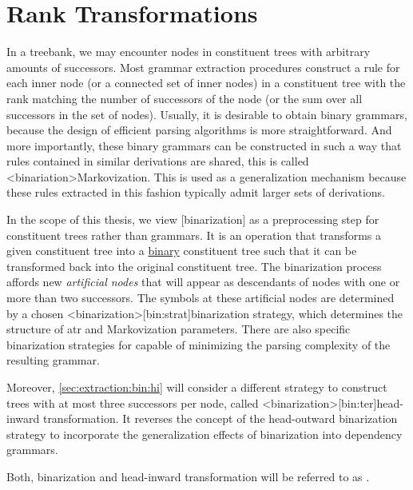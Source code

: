 \documentclass[../../document.tex]{subfiles}
\begin{document}
    \section{Rank Transformations}
    In a treebank, we may encounter nodes in constituent trees with arbitrary amounts of successors.
    Most grammar extraction procedures construct a rule for each inner node (or a connected set of inner nodes) in a constituent tree with the rank matching the number of successors of the node (or the sum over all successors in the set of nodes).
    Usually, it is desirable to obtain binary grammars, because the design of efficient parsing algorithms is more straightforward.
    And more importantly, these binary grammars can be constructed in such a way that rules contained in similar derivations are shared, this is called <binariation>{Markovization}.
    This is used as a generalization mechanism because these rules extracted in this fashion typically admit larger sets of derivations.

    In the scope of this thesis, we view [binarization] as a preprocessing step for constituent trees rather than grammars.
    It is an operation that transforms a given constituent tree into a \hyperlink{binctree}{binary} constituent tree such that it can be transformed back into the original constituent tree.
    The binarization process affords new \emph{artificial nodes} that will appear as descendants of nodes with one or more than two successors.
    The symbols at these artificial nodes are determined by a chosen <binarization>[bin:strat]{binarization strategy}, which determines the structure of atr and Markovization parameters. \citep{Son08,Cra12}
    There are also specific binarization strategies for  capable of minimizing the parsing complexity of the resulting grammar. \citep{Gil10}

    Moreover, \cref{sec:extraction:bin:hi} will consider a different strategy to construct trees with at most three successors per node, called <binarization>[bin:ter]{head-inward transformation}.
    It reverses the concept of the head-outward binarization strategy to incorporate the generalization effects of binarization into dependency grammars.

    Both, binarization and head-inward transformation will be referred to as .
\end{document}
